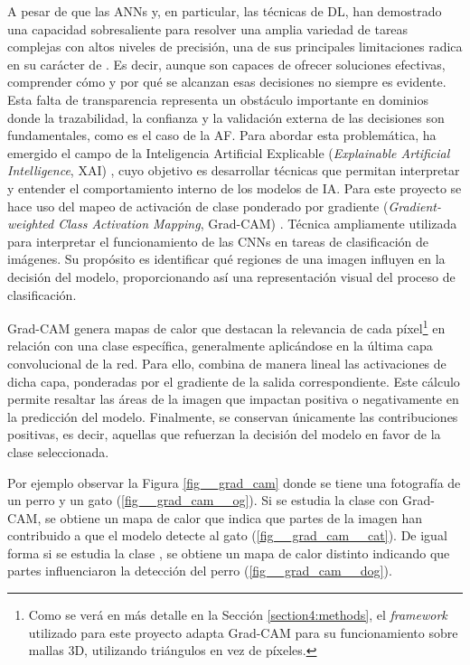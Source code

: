 A pesar de que las ANNs y, en particular, las técnicas de DL, han demostrado una capacidad sobresaliente para resolver una amplia variedad de tareas complejas con altos niveles de precisión, una de sus principales limitaciones radica en su carácter de . Es decir, aunque son capaces de ofrecer soluciones efectivas, comprender cómo y por qué se alcanzan esas decisiones no siempre es evidente. Esta falta de transparencia representa un obstáculo importante en dominios donde la trazabilidad, la confianza y la validación externa de las decisiones son fundamentales, como es el caso de la AF. Para abordar esta problemática, ha emergido el campo de la Inteligencia Artificial Explicable (\textit{Explainable Artificial Intelligence}, XAI) \cite{barredo_arrieta_explainable_2020}, cuyo objetivo es desarrollar técnicas que permitan interpretar y entender el comportamiento interno de los modelos de IA. Para este proyecto se hace uso del mapeo de activación de clase ponderado por gradiente (\textit{Gradient-weighted Class Activation Mapping}, Grad-CAM) \cite{selvaraju_grad_cam_2017}. Técnica ampliamente utilizada para interpretar el funcionamiento de las CNNs en tareas de clasificación de imágenes. Su propósito es identificar qué regiones de una imagen influyen en la decisión del modelo, proporcionando así una representación visual del proceso de clasificación.

Grad-CAM genera mapas de calor que destacan la relevancia de cada píxel\footnote{Como se verá en más detalle en la Sección \ref{section4:methods}, el \textit{framework} utilizado para este proyecto adapta Grad-CAM para su funcionamiento sobre mallas 3D, utilizando triángulos en vez de píxeles.} en relación con una clase específica, generalmente aplicándose en la última capa convolucional de la red. Para ello, combina de manera lineal las activaciones de dicha capa, ponderadas por el gradiente de la salida correspondiente. Este cálculo permite resaltar las áreas de la imagen que impactan positiva o negativamente en la predicción del modelo. Finalmente, se conservan únicamente las contribuciones positivas, es decir, aquellas que refuerzan la decisión del modelo en favor de la clase seleccionada.

Por ejemplo observar la Figura \ref{fig__grad_cam} donde se tiene una fotografía de un perro y un gato (\ref{fig__grad_cam__og}). Si se estudia la clase  con Grad-CAM, se obtiene un mapa de calor que indica que partes de la imagen han contribuido a que el modelo detecte al gato (\ref{fig__grad_cam__cat}). De igual forma si se estudia la clase , se obtiene un mapa de calor distinto indicando que partes influenciaron la detección del perro (\ref{fig__grad_cam__dog}).

